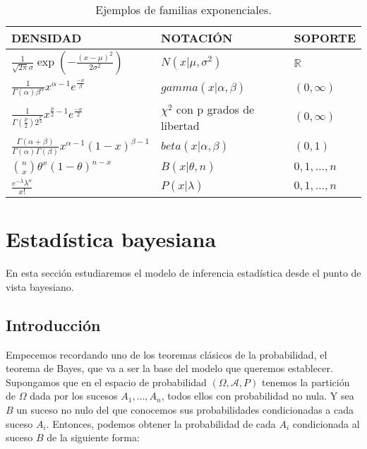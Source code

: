 \documentclass{article}
\newcommand{\importsection}[1]{}           %
\begin{document}
    \begin{table}[H]
    	\begin{center}
    		\begin{tabular}{|l|l|l|}
    			\hline
    			DENSIDAD & NOTACIÓN & SOPORTE\\
    			\hline \hline
                $\frac{1}{\sqrt{2 \pi} \sigma} \exp\left(- \frac{(x-\mu)^2}{2\sigma^2}\right)$ & $N(x|\mu, \sigma^2)$ & $\mathbb{R}$ \\
                \hline
                $\frac{1}{\Gamma(\alpha)\beta^\alpha}x^{\alpha - 1}e^{\frac{-x}{\beta}}$ & $ gamma(x|\alpha,\beta)$ &   $(0,\infty)  $\\ \hline
    			$\frac{1}{\Gamma(\frac{p}{2})2^{\frac{p}{2}}}x^{\frac{p}{2} - 1}e^{\frac{-x}{2}}$ & $\chi^2$ con p grados de libertad  & $(0,\infty)  $ \\ \hline
    			$\frac{\Gamma(\alpha + \beta)}{\Gamma(\alpha) \Gamma(\beta)} x ^{\alpha - 1}(1-x)^{\beta - 1}$ &  $beta(x| \alpha, \beta)$   &   $(0,1)$   \\ \hline
    			$\binom{n}{x} \theta ^x (1-\theta)^{n-x}$ &  $B(x|\theta, n)$ & ${0,1, \ldots , n}$   \\ \hline
    			$\frac{e^{-\lambda} \lambda^x}{x!}$ & $P(x|\lambda)$ & ${0,1, \ldots , n}$   \\ \hline
    		\end{tabular}
    	\end{center}
        \caption{Ejemplos de familias exponenciales.}
        \label{table:exponencial}
    \end{table}

\importsection{Hipotesis.tex}

\section{Estadística bayesiana} \label{sec:bayes}

En esta sección estudiaremos el modelo de inferencia estadística desde el punto de vista bayesiano.

\subsection{Introducción}

Empecemos recordando uno de los teoremas clásicos de la probabilidad, el teorema de Bayes, que va a ser la base del modelo que queremos establecer. Supongamos que en el espacio de probabilidad $(\Omega,\mathcal{A},P)$ tenemos la partición de $\Omega$ dada por los sucesos $A_1,\dots,A_n$, todos ellos con probabilidad no nula. Y sea $B$ un suceso no nulo del que conocemos sus probabilidades condicionadas a cada suceso $A_i$. Entonces, podemos obtener la probabilidad de cada $A_i$ condicionada al suceso $B$ de la siguiente forma:
\end{document}
